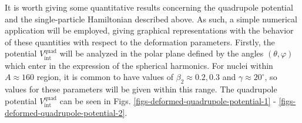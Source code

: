 It is worth giving some quantitative results concerning the quadrupole potential and the single-particle Hamiltonian described above. As such, a simple numerical application will be employed, giving graphical representations with the behavior of these quantities with respect to the deformation parameters. Firstly, the potential $V_\text{int}^\text{quad}$ will be analyzed in the polar plane defined by the angles $(\theta,\varphi)$ which enter in the expression of the spherical harmonics. For nuclei within $A\approx 160$ region, it is common to have values of $\beta_2\approx 0.2,0.3$ and $\gamma\approx 20^\circ$, so values for these parameters will be given within this range. The quadrupole potential $V_\text{int}^\text{quad}$ can be seen in Figs. \ref{figs-deformed-quadrupole-potential-1} - \ref{figs-deformed-quadrupole-potential-2}.

